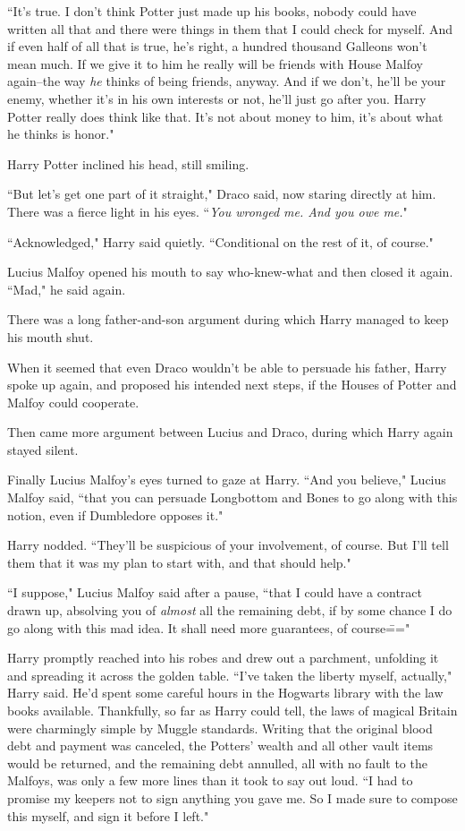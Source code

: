 ``It's true. I don't think Potter just made up his books, nobody could have written all that and there were things in them that I could check for myself. And if even half of all that is true, he's right, a hundred thousand Galleons won't mean much. If we give it to him he really will be friends with House Malfoy again\---the way \emph{he} thinks of being friends, anyway. And if we don't, he'll be your enemy, whether it's in his own interests or not, he'll just go after you. Harry Potter really does think like that. It's not about money to him, it's about what he thinks is honor."

Harry Potter inclined his head, still smiling.

``But let's get one part of it straight," Draco said, now staring directly at him. There was a fierce light in his eyes. ``\emph{You wronged me. \emph{And} you owe me.}"

``Acknowledged," Harry said quietly. ``Conditional on the rest of it, of course."

Lucius Malfoy opened his mouth to say who-knew-what and then closed it again. ``Mad," he said again.

There was a long father-and-son argument during which Harry managed to keep his mouth shut.

When it seemed that even Draco wouldn't be able to persuade his father, Harry spoke up again, and proposed his intended next steps, if the Houses of Potter and Malfoy could cooperate.

Then came more argument between Lucius and Draco, during which Harry again stayed silent.

Finally Lucius Malfoy's eyes turned to gaze at Harry. ``And you believe," Lucius Malfoy said, ``that you can persuade Longbottom and Bones to go along with this notion, even if Dumbledore opposes it."

Harry nodded. ``They'll be suspicious of your involvement, of course. But I'll tell them that it was my plan to start with, and that should help."

``I suppose," Lucius Malfoy said after a pause, ``that I could have a contract drawn up, absolving you of \emph{almost} all the remaining debt, if by some chance I do go along with this mad idea. It shall need more guarantees, of course\==="

Harry promptly reached into his robes and drew out a parchment, unfolding it and spreading it across the golden table. ``I've taken the liberty myself, actually," Harry said. He'd spent some careful hours in the Hogwarts library with the law books available. Thankfully, so far as Harry could tell, the laws of magical Britain were charmingly simple by Muggle standards. Writing that the original blood debt and payment was canceled, the Potters' wealth and all other vault items would be returned, and the remaining debt annulled, all with no fault to the Malfoys, was only a few more lines than it took to say out loud. ``I had to promise my keepers not to sign anything you gave me. So I made sure to compose this myself, and sign it before I left."

